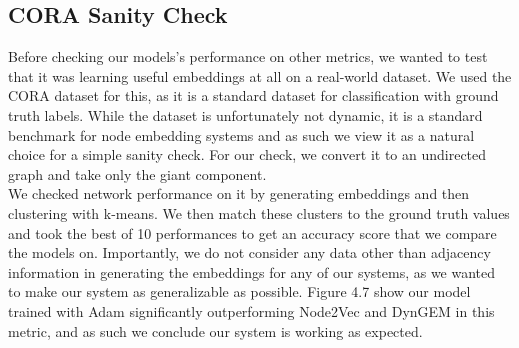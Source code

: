 \documentclass[12pt,twoside]{report}
\begin{document}
\subsection{CORA Sanity Check}

Before checking our models's performance on other metrics, we wanted to test that it was learning useful embeddings at all on a real-world dataset. We used the CORA dataset \cite{sen2008collective} for this, as it is a standard dataset for classification with ground truth labels. While the dataset is unfortunately not dynamic, it is a standard benchmark for node embedding systems and as such we view it as a natural choice for a simple sanity check. For our check, we convert it to an undirected graph and take only the giant component. \\

We checked network performance on it by generating embeddings and then clustering with k-means. We then match these clusters to the ground truth values and took the best of 10 performances to get an accuracy score that we compare the models on. Importantly, we do not consider any data other than adjacency information in generating the embeddings for any of our systems, as we wanted to make our system as generalizable as possible. Figure 4.7 show our model trained with Adam significantly outperforming Node2Vec and DynGEM in this metric, and as such we conclude our system is working as expected. \\
\end{document}
